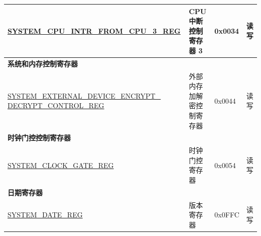\begin{longtable}{ | p{6.5cm} | p{5.5cm} | p{1.3cm} | p{2cm} | }
\hyperref[regdesc:SYSTEMCPUINTRFROMCPU3REG]{SYSTEM\_CPU\_INTR\_FROM\_CPU\_3\_REG} & CPU 中断控制寄存器 3 & 0x0034 & 读写 \\ \hline
\multicolumn{4}{|l|}{\textbf{系统和内存控制寄存器}} \\ \hline
\hyperref[regdesc:SYSTEMEXTERNALDEVICEENCRYPTDECRYPTCONTROLREG]{SYSTEM\_EXTERNAL\_DEVICE\_ENCRYPT\_} \hyperref[regdesc:SYSTEMEXTERNALDEVICEENCRYPTDECRYPTCONTROLREG]{DECRYPT\_CONTROL\_REG} & 外部内存加解密控制寄存器 & 0x0044 & 读写 \\ \hline
\multicolumn{4}{|l|}{\textbf{时钟门控控制寄存器}} \\ \hline
\hyperref[regdesc:SYSTEMCLOCKGATEREG]{SYSTEM\_CLOCK\_GATE\_REG} & 时钟门控寄存器 & 0x0054 & 读写 \\ \hline
\multicolumn{4}{|l|}{\textbf{日期寄存器}} \\ \hline
\hyperref[regdesc:SYSTEMDATEREG]{SYSTEM\_DATE\_REG} & 版本寄存器 & 0x0FFC & 读写 \\ \hline
\end{longtable}
